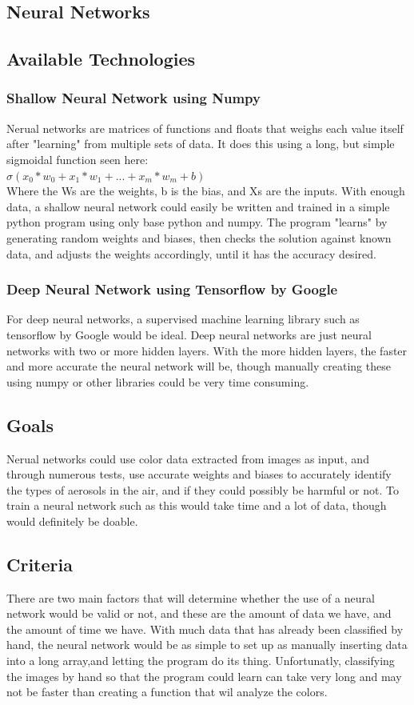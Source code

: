 \documentclass[onecolumn, draftclsnofoot,10pt, compsoc]{IEEEtran}
\begin{document}
\begin{singlespace}
\section{Neural Networks}
\subsection{Available Technologies}
\subsubsection{Shallow Neural Network using Numpy}
Nerual networks are matrices of functions and floats that weighs each value itself after "learning" from multiple sets of data. It does this using a long, but simple sigmoidal function seen here:\\
$\sigma(x_0*w_0 + x_1*w_1 + ... + x_m*w_m + b)$\cite{nn}\\
Where the Ws are the weights, b is the bias, and Xs are the inputs. 
With enough data, a shallow neural network could easily be written and trained in a simple python program using only base python and numpy. The program "learns" by generating random weights and biases, then checks the solution against known data, and adjusts the weights accordingly, until it has the accuracy desired. 

\subsubsection{Deep Neural Network using Tensorflow by Google}
For deep neural networks, a supervised machine learning library such as tensorflow by Google would be ideal. Deep neural networks are just neural networks with two or more hidden layers. With the more hidden layers, the faster and more accurate the neural network will be, though manually creating these using numpy or other libraries could be very time consuming.

\subsection{Goals}
Nerual networks could use color data extracted from images as input, and through numerous tests, use accurate weights and biases to accurately identify the types of aerosols in the air, and if they could possibly be harmful or not. To train a neural network such as this would take time and a lot of data, though would definitely be doable. 


\subsection{Criteria}
There are two main factors that will determine whether the use of a neural network would be valid or not, and these are the amount of data we have, and the amount of time we have. With much data that has already been classified by hand, the neural network would be as simple to set up as manually inserting data into a long array,and letting the program do its thing. Unfortunatly, classifying the images by hand so that the program could learn can take very long and may not be faster than creating a function that wil analyze the colors. 


\end{singlespace}
\end{document}
